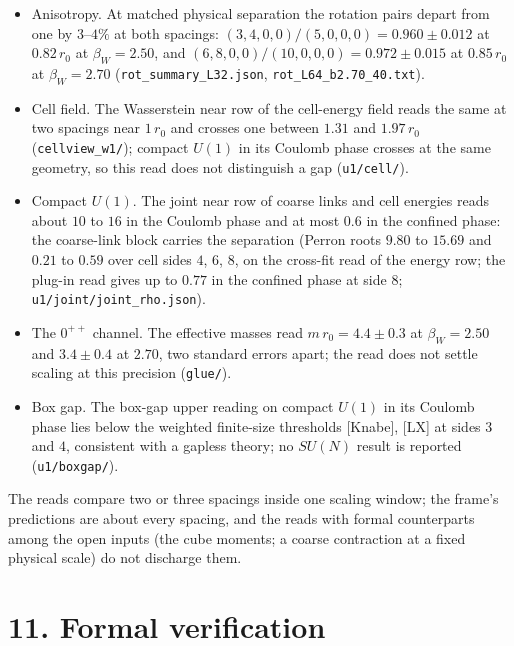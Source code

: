 \documentclass[10pt,letterpaper,twocolumn]{article}
\begin{document}
\begin{itemize}
\item
  Anisotropy. At matched physical separation the rotation pairs depart from one by \(3\)--\(4\%\) at both spacings: \((3,4,0,0)/(5,0,0,0)=0.960\pm0.012\) at \(0.82\,r_0\) at \(\beta_W=2.50\), and \((6,8,0,0)/(10,0,0,0)=0.972\pm0.015\) at \(0.85\,r_0\) at \(\beta_W=2.70\) (\texttt{rot\_\allowbreak{}summary\_\allowbreak{}L32.\allowbreak{}json}, \texttt{rot\_\allowbreak{}L64\_\allowbreak{}b2.\allowbreak{}70\_\allowbreak{}40.\allowbreak{}txt}).
\item
  Cell field. The Wasserstein near row of the cell-energy field reads the same at two spacings near \(1\,r_0\) and crosses one between \(1.31\) and \(1.97\,r_0\) (\texttt{cellview\_\allowbreak{}w1/\allowbreak{}}); compact \(U(1)\) in its Coulomb phase crosses at the same geometry, so this read does not distinguish a gap (\texttt{u1/\allowbreak{}cell/\allowbreak{}}).
\item
  Compact \(U(1)\). The joint near row of coarse links and cell energies reads about \(10\) to \(16\) in the Coulomb phase and at most \(0.6\) in the confined phase: the coarse-link block carries the separation (Perron roots \(9.80\) to \(15.69\) and \(0.21\) to \(0.59\) over cell sides \(4\), \(6\), \(8\), on the cross-fit read of the energy row; the plug-in read gives up to \(0.77\) in the confined phase at side \(8\); \texttt{u1/\allowbreak{}joint/\allowbreak{}joint\_\allowbreak{}rho.\allowbreak{}json}).
\item
  The \(0^{++}\) channel. The effective masses read \(m\,r_0=4.4\pm0.3\) at \(\beta_W=2.50\) and \(3.4\pm0.4\) at \(2.70\), two standard errors apart; the read does not settle scaling at this precision (\texttt{glue/\allowbreak{}}).
\item
  Box gap. The box-gap upper reading on compact \(U(1)\) in its Coulomb phase lies below the weighted finite-size thresholds {[}Knabe{]}, {[}LX{]} at sides \(3\) and \(4\), consistent with a gapless theory; no \(SU(N)\) result is reported (\texttt{u1/\allowbreak{}boxgap/\allowbreak{}}).
\end{itemize}

The reads compare two or three spacings inside one scaling window; the frame's predictions are about every spacing, and the reads with formal counterparts among the open inputs (the cube moments; a coarse contraction at a fixed physical scale) do not discharge them.

\section{11. Formal verification}\label{11-formal-verification}
\end{document}
